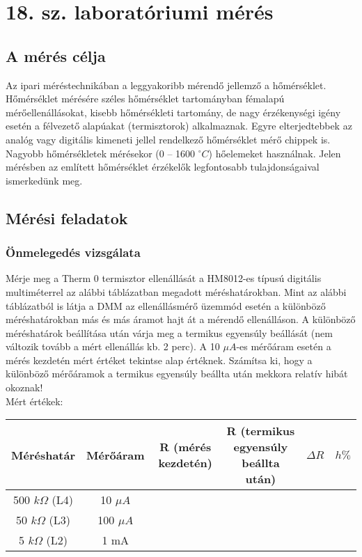 \documentclass[10pt,a4paper]{article}
\begin{document}
\section{18. sz. laboratóriumi mérés}
	\subsection{A mérés célja}
	Az ipari méréstechnikában a leggyakoribb mérendő jellemző a
hőmérséklet.
Hőmérséklet mérésére széles hőmérséklet tartományban
fémalapú mérőellenállásokat, kisebb hőmérsékleti tartomány, de
nagy érzékenységi igény esetén a félvezető alapúakat
(termisztorok) alkalmaznak. Egyre elterjedtebbek az analóg vagy
digitális kimeneti jellel rendelkező hőmérséklet mérő chippek is.
Nagyobb hőmérsékletek mérésekor (0 – 1600 $^{\circ}C$) hőelemeket
használnak. Jelen mérésben az említett hőmérséklet érzékelők legfontosabb
tulajdonságaival ismerkedünk meg.
	\subsection{Mérési feladatok}
\subsubsection{Önmelegedés vizsgálata}
Mérje meg a Therm 0 termisztor ellenállását a HM8012-es típusú
digitális multiméterrel az alábbi táblázatban megadott
méréshatárokban.
Mint az alábbi táblázatból is látja a DMM az ellenállásmérő
üzemmód esetén a különböző méréshatárokban más és más
áramot hajt át a mérendő ellenálláson.
A különböző méréshatárok beállítása után várja meg a termikus
egyensúly beállását (nem változik tovább a mért ellenállás kb. 2
perc). A 10 $\mu A$-es mérőáram esetén a mérés kezdetén mért értéket
tekintse alap értéknek. Számítsa ki, hogy a különböző mérőáramok a termikus egyensúly
beállta után mekkora relatív hibát okoznak!$$$$Mért értékek:$$$$\begin{tabular}{|c|c|c|c|c|c|}
\hline 
Méréshatár & Mérőáram & R (mérés kezdetén) & R (termikus egyensúly beállta után) & $\Delta R$ & $h \%$ \\ 
\hline 
500 $k\Omega$ (L4) & 10 $\mu A$ &  &  &  &  \\ 
\hline 
50 $k\Omega$ (L3) & 100 $\mu A$ &  &  &  &  \\ 
\hline 
5 $k\Omega$ (L2) & 1 mA &  &  &  &  \\ 
\hline 
\end{tabular} 
\end{document}
